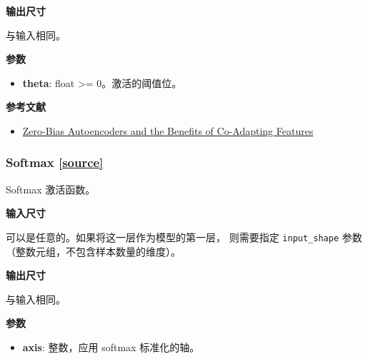 \textbf{输出尺寸}

与输入相同。

\textbf{参数}

\begin{itemize}
\tightlist
\item
  \textbf{theta}: float \textgreater{}= 0。激活的阈值位。
\end{itemize}

\textbf{参考文献}

\begin{itemize}
\tightlist
\item
  \href{http://arxiv.org/abs/1402.3337}{Zero-Bias Autoencoders and the
  Benefits of Co-Adapting Features}
\end{itemize}



\subsubsection{Softmax {\href{https://github.com/keras-team/keras/blob/master/keras/layers/advanced_activations.py\#L230}{{[}source{]}}}}

\begin{Shaded}
\begin{Highlighting}[]
\OperatorTok{=-}\NormalTok{)}
\end{Highlighting}
\end{Shaded}

Softmax 激活函数。

\textbf{输入尺寸}

可以是任意的。如果将这一层作为模型的第一层， 则需要指定
\texttt{input\_shape} 参数 （整数元组，不包含样本数量的维度）。

\textbf{输出尺寸}

与输入相同。

\textbf{参数}

\begin{itemize}
\tightlist
\item
  \textbf{axis}: 整数，应用 softmax 标准化的轴。
\end{itemize}

\newpage
